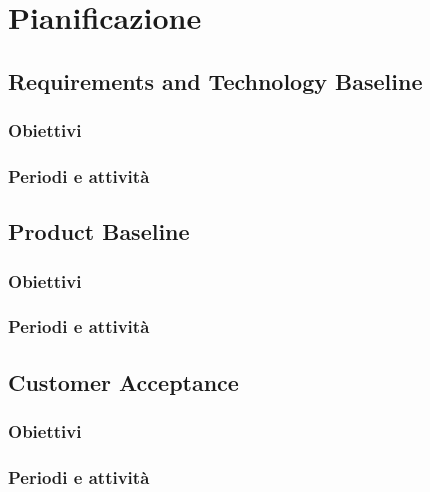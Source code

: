 \section{Pianificazione} \label{section:pianificazione}

\subsection{Requirements and Technology Baseline} \label{subsection:pianificazione_rtb}
\subsubsection{Obiettivi} \label{subsubsection:obiettivi_rtb}
\subsubsection{Periodi e attività} \label{subsubsection:periodi_rtb}


\subsection{Product Baseline} \label{subsection:pianificazione_pb}
\subsubsection{Obiettivi} \label{subsubsection:obiettivi_pb}
\subsubsection{Periodi e attività} \label{subsubsection:periodi_pb}


\subsection{Customer Acceptance} \label{subsection:pianificazione_ca}
\subsubsection{Obiettivi} \label{subsubsection:obiettivi_ca}
\subsubsection{Periodi e attività} \label{subsubsection:periodi_ca}